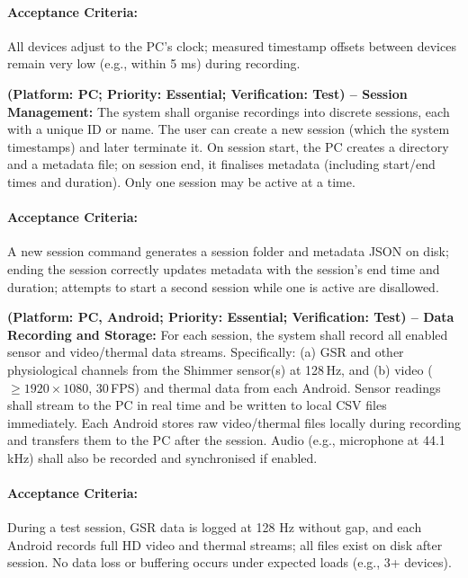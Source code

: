 \begin{description}[style=unboxed,leftmargin=0cm]
    \paragraph{Acceptance Criteria:} All devices adjust to the PC’s clock; measured timestamp offsets between devices remain very low (e.g., within 5 ms) during recording.

    \item[\textbf{FR4}] \textbf{(Platform: PC; Priority: Essential; Verification: Test) – Session Management:} The system shall organise recordings into discrete sessions, each with a unique ID or name. The user can create a new session (which the system timestamps) and later terminate it. On session start, the PC creates a directory and a metadata file; on session end, it finalises metadata (including start/end times and duration). Only one session may be active at a time.

    \paragraph{Acceptance Criteria:} A new session command generates a session folder and metadata JSON on disk; ending the session correctly updates metadata with the session’s end time and duration; attempts to start a second session while one is active are disallowed.

    \item[\textbf{FR5}] \textbf{(Platform: PC, Android; Priority: Essential; Verification: Test) – Data Recording and Storage:} For each session, the system shall record all enabled sensor and video/thermal data streams. Specifically: (a) GSR and other physiological channels from the Shimmer sensor(s) at 128\,Hz, and (b) video ($\geq 1920 \times 1080$, 30\,FPS) and thermal data from each Android. Sensor readings shall stream to the PC in real time and be written to local CSV files immediately. Each Android stores raw video/thermal files locally during recording and transfers them to the PC after the session. Audio (e.g., microphone at 44.1\,kHz) shall also be recorded and synchronised if enabled.

    \paragraph{Acceptance Criteria:} During a test session, GSR data is logged at 128 Hz without gap, and each Android records full HD video and thermal streams; all files exist on disk after session. No data loss or buffering occurs under expected loads (e.g., 3+ devices).


\end{description}
